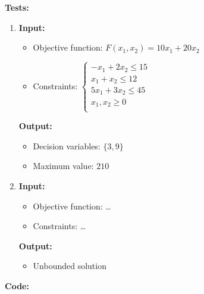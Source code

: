 \documentclass{article}
\begin{document}
\textbf{Tests:}
\begin{enumerate}[label={(\arabic*)}]
    \item \textbf{Input:}
          \begin{itemize}[label=-]
              \item Objective function: \(F(x_1, x_2) = 10 x_1 + 20 x_2\)
              \item Constraints: \(\begin{cases}
                        -x_1 + 2 x_2 \le 15  \\
                        x_1 + x_2 \le 12     \\
                        5 x_1 + 3 x_2 \le 45 \\
                        x_1, x_2 \ge 0       \\
                    \end{cases}\)
          \end{itemize}

          \textbf{Output:}
          \begin{itemize}[label=-]
              \item Decision variables: \({\{ 3, 9 \}}\)
              \item Maximum value: \(210\)
          \end{itemize}

    \item \textbf{Input:}
          \begin{itemize}[label=-]
              \item Objective function: \dots
              \item Constraints: \dots
          \end{itemize}

          \textbf{Output:}
          \begin{itemize}[label=-]
              \item Unbounded solution
          \end{itemize}
\end{enumerate}

\newpage

\textbf{Code:}


\newpage


\newpage

\end{document}
